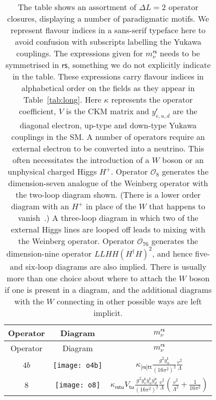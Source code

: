 \begin{longtable}[t]{ccc}
  \caption[The table shows an assortment of $\Delta L = 2$ operator closures, displaying a number of paradigmatic motifs.]{The table shows an assortment of $\Delta L = 2$ operator closures, displaying a number of paradigmatic motifs. We represent flavour indices in a sans-serif typeface here to avoid confusion with subscripts labelling the Yukawa couplings. The expressions given for $m_{\nu}^{\textsf{rs}}$ needs to be symmetrised in $\textsf{rs}$, something we do not explicitly indicate in the table. These expressions carry flavour indices in alphabetical order on the fields as they appear in Table~\ref{tab:long}. Here $\kappa$ represents the operator coefficient, $V$ is the CKM matrix and $y^{\textsf{r}}_{e,u,d}$ are the diagonal electron, up-type and down-type Yukawa couplings in the SM. A number of operators require an external electron to be converted into a neutrino. This often necessitates the introduction of a $W$ boson or an unphysical charged Higgs $H^{+}$. Operator $\mathcal{O}_{8}$ generates the dimension-seven analogue of the Weinberg operator with the two-loop diagram shown. (There is a lower order diagram with an $H^{+}$ in place of the $W$ that happens to vanish~\cite{Babu:2010vp}.) A three-loop diagram in which two of the external Higgs lines are looped off leads to mixing with the Weinberg operator. Operator $\mathcal{O}_{76}$ generates the dimension-nine operator $LLHH(H^{\dagger}H)^{2}$, and hence five- and six-loop diagrams are also implied. There is usually more than one choice about where to attach the $W$ boson if one is present in a diagram, and the additional diagrams with the $W$ connecting in other possible ways are left implicit.\label{tab:example-closures}}\\
  \toprule
  Operator & Diagram & $m_{\nu}^{\textsf{rs}}$ \\
  \midrule \endfirsthead \toprule
  Operator & Diagram & $m_{\nu}^{\textsf{rs}}$ \\
  \midrule \endhead $4b$ &
\begin{minipage}{0.2\linewidth}
  \centering
  \texttt{[image: o4b]}
\end{minipage}
  & $\displaystyle \kappa_{\textsf{[rs]tt}} \frac{g^{2} y_u^{\textsf{t}}}{(16\pi^{2})^{2}} \frac{v^{2}}{\Lambda}$  \\
    $8$ &
    \begin{minipage}{0.2\linewidth}
        \centering
        \texttt{[image: o8]}
      \end{minipage} & $\displaystyle \kappa_{\textsf{rstu}} V_{\textsf{tu}} \frac{g^{2} y_{e}^{\textsf{s}} y_{u}^{\textsf{t}} y_{d}^{\textsf{u}}}{(16\pi^{2})^{2}} \frac{v^{2}}{\Lambda} \left( \frac{v^{2}}{\Lambda^{2}} + \frac{1}{16 \pi^{2}}\right)$ \\

\end{longtable}
